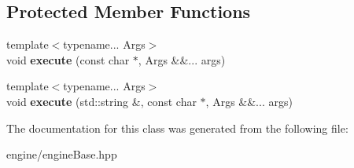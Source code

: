 \subsection*{Protected Member Functions}
\begin{DoxyCompactItemize}
\item 
\mbox{\label{classEngineBase_a939dfd79b49b4f3f7e41bc6b3a93c8b5}} 
{\footnotesize template$<$typename... Args$>$ }\\void {\bfseries execute} (const char $\ast$, Args \&\&... args)
\item 
\mbox{\label{classEngineBase_a339cd7c8de521c66ee4ca97c641e0607}} 
{\footnotesize template$<$typename... Args$>$ }\\void {\bfseries execute} (std\+::string \&, const char $\ast$, Args \&\&... args)
\end{DoxyCompactItemize}


The documentation for this class was generated from the following file\+:\begin{DoxyCompactItemize}
\item 
engine/engine\+Base.\+hpp\end{DoxyCompactItemize}
